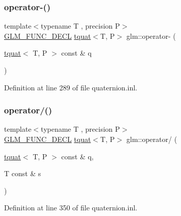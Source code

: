 \subsubsection{\texorpdfstring{operator-\/()}{operator-()}}
{\footnotesize\ttfamily template$<$typename T , precision P$>$ \\
\mbox{\hyperlink{setup_8hpp_ab2d052de21a70539923e9bcbf6e83a51}{G\+L\+M\+\_\+\+F\+U\+N\+C\+\_\+\+D\+E\+CL}} \mbox{\hyperlink{structglm_1_1tquat}{tquat}}$<$T, P$>$ glm\+::operator-\/ (\begin{DoxyParamCaption}\item[{\mbox{\hyperlink{structglm_1_1tquat}{tquat}}$<$ T, P $>$ const \&}]{q }\end{DoxyParamCaption})}



Definition at line 289 of file quaternion.\+inl.

\mbox{\label{group__gtc__quaternion_gab52fd3ac627908aa2aa1df96ddcdd113}} 
\subsubsection{\texorpdfstring{operator/()}{operator/()}}
{\footnotesize\ttfamily template$<$typename T , precision P$>$ \\
\mbox{\hyperlink{setup_8hpp_ab2d052de21a70539923e9bcbf6e83a51}{G\+L\+M\+\_\+\+F\+U\+N\+C\+\_\+\+D\+E\+CL}} \mbox{\hyperlink{structglm_1_1tquat}{tquat}}$<$T, P$>$ glm\+::operator/ (\begin{DoxyParamCaption}\item[{\mbox{\hyperlink{structglm_1_1tquat}{tquat}}$<$ T, P $>$ const \&}]{q,  }\item[{T const \&}]{s }\end{DoxyParamCaption})}



Definition at line 350 of file quaternion.\+inl.

\mbox{\label{group__gtc__quaternion_ga7070e4e3cfdac395b3392219a365d95b}} 
